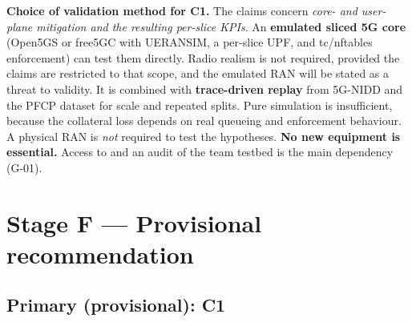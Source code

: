 \textbf{Choice of validation method for C1.} The claims concern
\emph{core- and user-plane mitigation and the resulting per-slice KPIs}.
An \textbf{emulated sliced 5G core} (Open5GS or free5GC with UERANSIM, a
per-slice UPF, and tc/nftables enforcement) can test them directly.
Radio realism is not required, provided the claims are restricted to
that scope, and the emulated RAN will be stated as a threat to validity.
It is combined with \textbf{trace-driven replay} from 5G-NIDD and the
PFCP dataset for scale and repeated splits. Pure simulation is
insufficient, because the collateral loss depends on real queueing and
enforcement behaviour. A physical RAN is \emph{not} required to test the
hypotheses. \textbf{No new equipment is essential.} Access to and an
audit of the team testbed is the main dependency (G-01).

\hypertarget{sec:rec}{%
\section{Stage F --- Provisional recommendation}\label{sec:rec}}

\hypertarget{primary-provisional-c1}{%
\subsection{Primary (provisional): C1}\label{primary-provisional-c1}}

